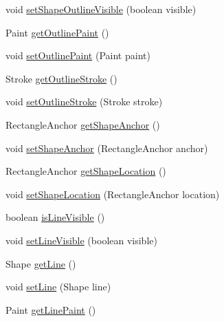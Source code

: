 \begin{DoxyCompactItemize}
\item 
void \mbox{\hyperlink{classorg_1_1jfree_1_1chart_1_1title_1_1_legend_graphic_a779afaf78a0072d77a1655ee25123dd3}{set\+Shape\+Outline\+Visible}} (boolean visible)
\item 
Paint \mbox{\hyperlink{classorg_1_1jfree_1_1chart_1_1title_1_1_legend_graphic_a0e3663eec1cd7ca9ab1af059cfd8e59a}{get\+Outline\+Paint}} ()
\item 
void \mbox{\hyperlink{classorg_1_1jfree_1_1chart_1_1title_1_1_legend_graphic_afc046475b36b33eb947fccd915b1a44f}{set\+Outline\+Paint}} (Paint paint)
\item 
Stroke \mbox{\hyperlink{classorg_1_1jfree_1_1chart_1_1title_1_1_legend_graphic_a8aaf034ed05a0cdecd32559eef6d7566}{get\+Outline\+Stroke}} ()
\item 
void \mbox{\hyperlink{classorg_1_1jfree_1_1chart_1_1title_1_1_legend_graphic_a64e612da91f167c9bff186af2c4eed94}{set\+Outline\+Stroke}} (Stroke stroke)
\item 
Rectangle\+Anchor \mbox{\hyperlink{classorg_1_1jfree_1_1chart_1_1title_1_1_legend_graphic_a04dfa116bb1d4aa8de4db26270c84501}{get\+Shape\+Anchor}} ()
\item 
void \mbox{\hyperlink{classorg_1_1jfree_1_1chart_1_1title_1_1_legend_graphic_a392280321e9ef4cd9863829e3d147ba8}{set\+Shape\+Anchor}} (Rectangle\+Anchor anchor)
\item 
Rectangle\+Anchor \mbox{\hyperlink{classorg_1_1jfree_1_1chart_1_1title_1_1_legend_graphic_a270c25c2d4228d350f95aa6653f49bf8}{get\+Shape\+Location}} ()
\item 
void \mbox{\hyperlink{classorg_1_1jfree_1_1chart_1_1title_1_1_legend_graphic_a24126e36b9ff60d4b4616943894b5d4b}{set\+Shape\+Location}} (Rectangle\+Anchor location)
\item 
boolean \mbox{\hyperlink{classorg_1_1jfree_1_1chart_1_1title_1_1_legend_graphic_ad674b4beaa7cabe7f5b50e7c47a3e87d}{is\+Line\+Visible}} ()
\item 
void \mbox{\hyperlink{classorg_1_1jfree_1_1chart_1_1title_1_1_legend_graphic_a5723644cc122bf1a69c802c973201dca}{set\+Line\+Visible}} (boolean visible)
\item 
Shape \mbox{\hyperlink{classorg_1_1jfree_1_1chart_1_1title_1_1_legend_graphic_a29368c04acca49c9e247a41359583b16}{get\+Line}} ()
\item 
void \mbox{\hyperlink{classorg_1_1jfree_1_1chart_1_1title_1_1_legend_graphic_a9b43b803b92c87a92717ce4fd1c6c484}{set\+Line}} (Shape line)
\item 
Paint \mbox{\hyperlink{classorg_1_1jfree_1_1chart_1_1title_1_1_legend_graphic_a6b401a8f825fcf68b9e3ac3eeb5669ef}{get\+Line\+Paint}} ()

\end{DoxyCompactItemize}
